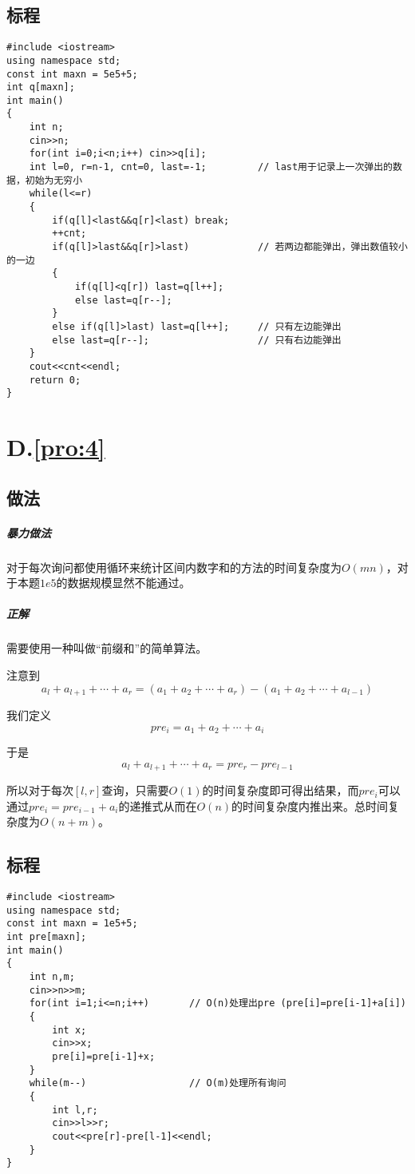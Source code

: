 \documentclass[
	lang=cn,
	color=blue
]{elegantbook}
\begin{document}
\section*{标程}
\begin{lstlisting}
#include <iostream>
using namespace std;
const int maxn = 5e5+5;
int q[maxn];
int main()
{
    int n;
    cin>>n;
    for(int i=0;i<n;i++) cin>>q[i];
    int l=0, r=n-1, cnt=0, last=-1;         // last用于记录上一次弹出的数据，初始为无穷小
    while(l<=r)
    {
        if(q[l]<last&&q[r]<last) break;
        ++cnt;
        if(q[l]>last&&q[r]>last)            // 若两边都能弹出，弹出数值较小的一边
        {
            if(q[l]<q[r]) last=q[l++];
            else last=q[r--];
        }
        else if(q[l]>last) last=q[l++];     // 只有左边能弹出
        else last=q[r--];                   // 只有右边能弹出
    }
    cout<<cnt<<endl;
    return 0;
}
\end{lstlisting}

\chapter*{D.\quad \ref*{pro:4}}
\section*{做法}
\paragraph*{暴力做法} 对于每次询问都使用循环来统计区间内数字和的方法的时间复杂度为$O(mn)$，对于本题$1e5$的数据规模显然不能通过。

\paragraph*{正解} 需要使用一种叫做“前缀和”的简单算法。

注意到$$a_l+a_{l+1}+ \cdots + a_r = (a_1 + a_2 + \cdots + a_r) - (a_1 + a_2 + \cdots + a_{l-1})$$

我们定义$$pre_i = a_1 + a_2 + \cdots + a_i$$

于是$$a_l+a_{l+1}+ \cdots + a_r = pre_r - pre_{l-1}$$

所以对于每次$[l,r]$查询，只需要$O(1)$的时间复杂度即可得出结果，而$pre_i$可以通过$pre_i = pre_{i-1} + a_i$的递推式从而在$O(n)$的时间复杂度内推出来。总时间复杂度为$O(n+m)$。

\section*{标程}
\begin{lstlisting}
#include <iostream>
using namespace std;
const int maxn = 1e5+5;
int pre[maxn];
int main()
{
    int n,m;
    cin>>n>>m;
    for(int i=1;i<=n;i++)       // O(n)处理出pre (pre[i]=pre[i-1]+a[i])
    {
        int x;
        cin>>x;
        pre[i]=pre[i-1]+x;
    }
    while(m--)                  // O(m)处理所有询问
    {
        int l,r;
        cin>>l>>r;
        cout<<pre[r]-pre[l-1]<<endl;
    }
}
\end{lstlisting}
\end{document}
